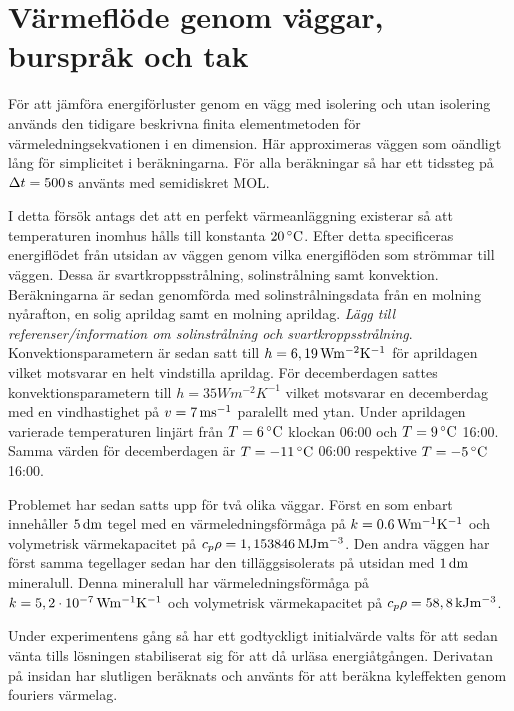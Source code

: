 \section{Värmeflöde genom väggar, burspråk och tak}

För att jämföra energiförluster genom en vägg med isolering och utan isolering används
den tidigare beskrivna finita elementmetoden för värmeledningsekvationen i en dimension. Här approximeras
väggen som oändligt lång för simplicitet i beräkningarna. För alla beräkningar så har ett tidssteg
på $\Delta t = \unit[500]{s}$ använts med semidiskret MOL.

I detta försök antags det att en perfekt värmeanläggning
existerar så att temperaturen inomhus hålls till konstanta $\unit[20]{^\circ C}$. Efter detta specificeras energiflödet
från utsidan av väggen genom vilka energiflöden som strömmar till väggen. Dessa är svartkroppsstrålning, solinstrålning
samt konvektion. Beräkningarna är sedan genomförda med solinstrålningsdata från en molning nyårafton,
en solig aprildag samt en molning aprildag.\emph{\color{red} Lägg till referenser/information om solinstrålning och svartkroppsstrålning}.
Konvektionsparametern är sedan satt till $h=\unit[6,19]{Wm^{-2}K^{-1}}$ för aprildagen vilket motsvarar en helt vindstilla aprildag.
För decemberdagen sattes konvektionsparametern till $h=\unit{35}{Wm^{-2}K^{-1}}$ vilket motsvarar en decemberdag med en vindhastighet på $v=\unit[7]{ms^{-1}}$ paralellt
med ytan.
Under aprildagen varierade temperaturen linjärt från $T=\unit[6]{^\circ C}$ klockan 06:00 och $T=\unit[9]{^\circ C}$ 16:00.
Samma värden för decemberdagen är $T = \unit[-11]{^\circ C}$ 06:00 respektive $T=\unit[-5]{^\circ C}$ 16:00.

Problemet har sedan satts upp för två olika väggar. Först en som enbart innehåller $\unit[5]{dm}$ tegel med
en värmeledningsförmåga på $k = \unit[0.6]{Wm^{-1}K^{-1}}$ och volymetrisk värmekapacitet på
$c_{p}\rho = \unit[1,153846]{MJm^{-3}}$. Den andra väggen har först samma tegellager sedan
har den tilläggsisolerats på utsidan med $\unit[1]{dm}$ mineralull. Denna mineralull har värmeledningsförmåga på
$k = \unit[5,2\cdot 10^{-7}]{Wm^{-1}K^{-1}}$ och volymetrisk värmekapacitet på
$c_{p}\rho = \unit[58,8]{kJ m^{-3}}$. \cite{kandidatarbete2010}\cite{engineeringtoolboxdensity}\cite{bkvthermal}\cite{engineeringtoolboxspecificheat}

Under experimentens gång så har ett godtyckligt initialvärde valts för att sedan vänta tills
lösningen stabiliserat sig för att då urläsa energiåtgången. Derivatan på insidan har slutligen beräknats
och använts för att beräkna kyleffekten genom fouriers värmelag.

